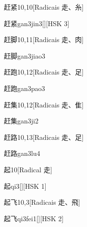 \begin{entry}{赶紧}{10,10}[Radicais ⾛、⽷]
  \begin{phonetics}{赶紧}{gan3jin3}[][HSK 3]
  \end{phonetics}
\end{entry}

\begin{entry}{赶脚}{10,11}[Radicais ⾛、⾁]
  \begin{phonetics}{赶脚}{gan3jiao3}
  \end{phonetics}
\end{entry}

\begin{entry}{赶跑}{10,12}[Radicais ⾛、⾜]
  \begin{phonetics}{赶跑}{gan3pao3}
  \end{phonetics}
\end{entry}

\begin{entry}{赶集}{10,12}[Radicais ⾛、⾫]
  \begin{phonetics}{赶集}{gan3ji2}
  \end{phonetics}
\end{entry}

\begin{entry}{赶路}{10,13}[Radicais ⾛、⾜]
  \begin{phonetics}{赶路}{gan3lu4}
  \end{phonetics}
\end{entry}

\begin{entry}{起}{10}[Radical ⾛]
  \begin{phonetics}{起}{qi3}[][HSK 1]
  \end{phonetics}
\end{entry}

\begin{entry}{起飞}{10,3}[Radicais ⾛、⾶]
  \begin{phonetics}{起飞}{qi3fei1}[][HSK 2]
  \end{phonetics}
\end{entry}

